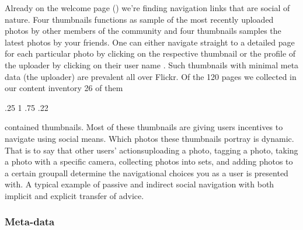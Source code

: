 Already on the welcome page ()
we're finding navigation links that are social of
nature. Four thumbnails functions as sample of the most recently uploaded
photos by other members of the community and four thumbnails samples the
latest photos by your friends.
One can either navigate straight to
a detailed page for each particular photo by clicking on the respective
thumbnail 
or the profile of the uploader by clicking on their user
name . Such thumbnails
with minimal meta data (the uploader) are prevalent all over Flickr. Of the
120 pages we collected in our content inventory 26 of them
\begin{sparkline}{3}
  \sparkspike .25  1
  \sparkspike .75  .22
\end{sparkline}
contained thumbnails. Most of these thumbnails
are giving users incentives to navigate using social means.%
Which photos these thumbnails portray is dynamic. That is to say that other
users' actions\dash{}uploading a photo, tagging a photo, taking a photo with a
specific camera, collecting photos into sets, and adding photos to a certain
group\dash{}all determine the navigational choices you as a user is
presented with. A typical example of passive and indirect social navigation
with both implicit and explicit transfer of advice.

\subsubsection{Meta-data}

